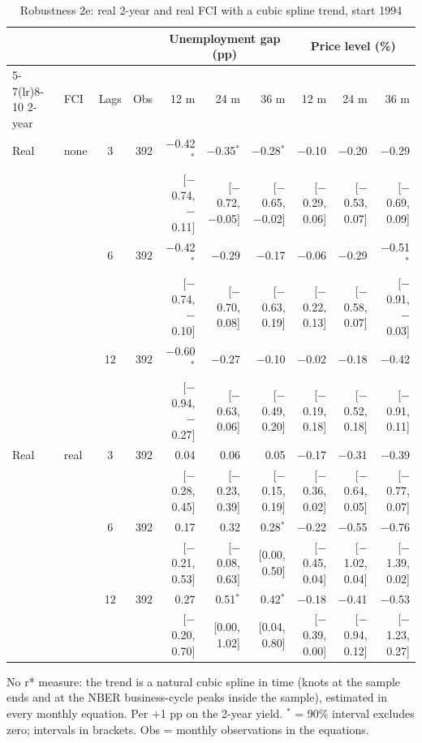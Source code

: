 \begin{table}[p]\centering\footnotesize\setlength{\tabcolsep}{2.2pt}
\caption{Robustness 2e: real 2-year and real FCI with a cubic spline trend, start 1994}\label{tab:R2e}
\begin{tabular}{llcrrrrrrr}\toprule
 & & & & \multicolumn{3}{c}{Unemployment gap (pp)} & \multicolumn{3}{c}{Price level (\%)}\\ \cmidrule(lr){5-7}\cmidrule(lr){8-10}
2-year & FCI & Lags & Obs & 12 m & 24 m & 36 m & 12 m & 24 m & 36 m\\ \midrule
Real & none & 3 & 392 & $-$0.42$^{*}$ & $-$0.35$^{*}$ & $-$0.28$^{*}$ & $-$0.10 & $-$0.20 & $-$0.29\\
 & & & & {\scriptsize [$-$0.74, $-$0.11]} & {\scriptsize [$-$0.72, $-$0.05]} & {\scriptsize [$-$0.65, $-$0.02]} & {\scriptsize [$-$0.29, 0.06]} & {\scriptsize [$-$0.53, 0.07]} & {\scriptsize [$-$0.69, 0.09]}\\
 &  & 6 & 392 & $-$0.42$^{*}$ & $-$0.29 & $-$0.17 & $-$0.06 & $-$0.29 & $-$0.51$^{*}$\\
 & & & & {\scriptsize [$-$0.74, $-$0.10]} & {\scriptsize [$-$0.70, 0.08]} & {\scriptsize [$-$0.63, 0.19]} & {\scriptsize [$-$0.22, 0.13]} & {\scriptsize [$-$0.58, 0.07]} & {\scriptsize [$-$0.91, $-$0.03]}\\
 &  & 12 & 392 & $-$0.60$^{*}$ & $-$0.27 & $-$0.10 & $-$0.02 & $-$0.18 & $-$0.42\\
 & & & & {\scriptsize [$-$0.94, $-$0.27]} & {\scriptsize [$-$0.63, 0.06]} & {\scriptsize [$-$0.49, 0.20]} & {\scriptsize [$-$0.19, 0.18]} & {\scriptsize [$-$0.52, 0.18]} & {\scriptsize [$-$0.91, 0.11]}\\
Real & real & 3 & 392 & 0.04 & 0.06 & 0.05 & $-$0.17 & $-$0.31 & $-$0.39\\
 & & & & {\scriptsize [$-$0.28, 0.45]} & {\scriptsize [$-$0.23, 0.39]} & {\scriptsize [$-$0.15, 0.19]} & {\scriptsize [$-$0.36, 0.02]} & {\scriptsize [$-$0.64, 0.05]} & {\scriptsize [$-$0.77, 0.07]}\\
 &  & 6 & 392 & 0.17 & 0.32 & 0.28$^{*}$ & $-$0.22 & $-$0.55 & $-$0.76\\
 & & & & {\scriptsize [$-$0.21, 0.53]} & {\scriptsize [$-$0.08, 0.63]} & {\scriptsize [0.00, 0.50]} & {\scriptsize [$-$0.45, 0.04]} & {\scriptsize [$-$1.02, 0.04]} & {\scriptsize [$-$1.39, 0.02]}\\
 &  & 12 & 392 & 0.27 & 0.51$^{*}$ & 0.42$^{*}$ & $-$0.18 & $-$0.41 & $-$0.53\\
 & & & & {\scriptsize [$-$0.20, 0.70]} & {\scriptsize [0.00, 1.02]} & {\scriptsize [0.04, 0.80]} & {\scriptsize [$-$0.39, 0.00]} & {\scriptsize [$-$0.94, 0.12]} & {\scriptsize [$-$1.23, 0.27]}\\
\bottomrule\end{tabular}
\par\smallskip\parbox{0.96\linewidth}{\scriptsize No r* measure: the trend is a natural cubic spline in time (knots at the sample ends and at the NBER business-cycle peaks inside the sample), estimated in every monthly equation. Per +1 pp on the 2-year yield. $^{*}$ = 90\% interval excludes zero; intervals in brackets. Obs = monthly observations in the equations.}
\end{table}
